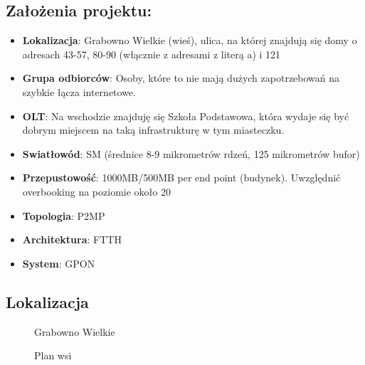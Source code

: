 \subsection{Założenia projektu:}
\begin{itemize}
	\item \textbf{Lokalizacja}: Grabowno Wielkie (wieś), ulica, na której znajdują się domy o adresach 43-57, 80-90 (włącznie z adresami z literą a) i 121
	\item \textbf{Grupa odbiorców}: Osoby, które to nie mają dużych zapotrzebowań na szybkie łącza internetowe.
	\item \textbf{OLT}: Na wschodzie znajduję się Szkoła Podstawowa, która wydaje się być dobrym miejscem na taką infrastrukturę w tym miasteczku.
	\item \textbf{Swiatłowód}: SM (średnice 8-9 mikrometrów rdzeń, 125 mikrometrów bufor)
	\item \textbf{Przepustowość}: 1000MB/500MB per end point (budynek). Uwzględnić overbooking na poziomie około 20%
	\item \textbf{Topologia}: P2MP
	\item \textbf{Architektura}: FTTH
	\item \textbf{System}: GPON
\end{itemize}

\newpage
\subsection{Lokalizacja}

	\begin{center}
		\begin{figure}[h!]
			\caption{Grabowno Wielkie}
			\label{fig:grabowno_intro}
		\end{figure}
		\begin{figure}[h!]
			\caption{Plan wsi}
			\label{fig:plan_intro}
		\end{figure}
	\end{center}


